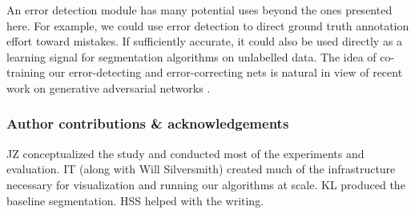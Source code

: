 \documentclass{article}
\begin{document}
An error detection module has many potential uses beyond the ones presented
here. For example, we could use error detection to direct ground truth
annotation effort toward mistakes. If sufficiently accurate, it could also be
used directly as a learning signal for segmentation algorithms on unlabelled
data. The idea of co-training our error-detecting and error-correcting nets is
natural in view of recent work on generative adversarial networks
\cite{cgan1,cgan2}.




\subsubsection*{Author contributions \& acknowledgements}
JZ conceptualized the study and conducted most of the experiments and
evaluation. IT (along with Will Silversmith) created much of the infrastructure
necessary for visualization and running our algorithms at scale. KL produced the
baseline segmentation. HSS helped with the writing.
\end{document}
